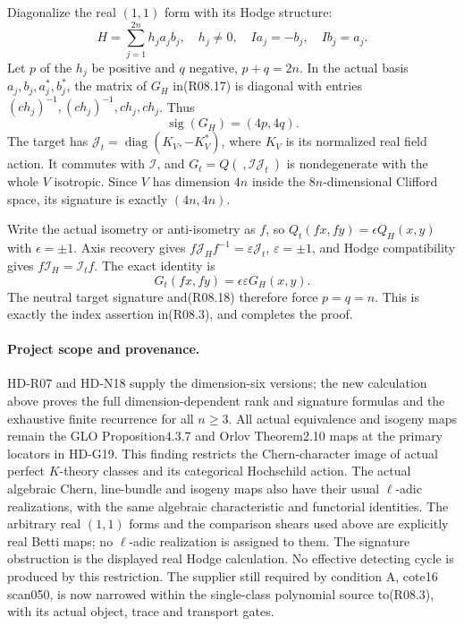 Diagonalize the real $(1,1)$ form with its Hodge structure:
\[
 H=\sum_{j=1}^{2n}h_j a_jb_j,\quad h_j\ne0,\quad
 Ia_j=-b_j,\quad Ib_j=a_j.
\]
Let $p$ of the $h_j$ be positive and $q$ negative, $p+q=2n$.
In the actual basis $a_j,b_j,a_j^*,b_j^*$, the matrix of $G_H$
in(R08.17) is diagonal with entries
$(ch_j)^{-1},(ch_j)^{-1},ch_j,ch_j$. Thus
\[
                          \operatorname{sig}(G_H)=(4p,4q).
                                                               \tag{R08.18}
\]
The target has
$\mathcal J_t=\operatorname{diag}(K_V,-K_V^*)$, where
$K_V$ is its normalized real field action. It commutes with
$\mathcal I$, and $G_t=Q(\ ,\mathcal I\mathcal J_t\ )$ is
nondegenerate with the whole $V$ isotropic. Since $V$ has
dimension $4n$ inside the $8n$-dimensional Clifford space,
its signature is exactly $(4n,4n)$.

Write the actual isometry or anti-isometry as $f$, so
$Q_t(fx,fy)=\epsilon Q_H(x,y)$ with $\epsilon=\pm1$.
Axis recovery gives
$f\mathcal J_Hf^{-1}=\varepsilon\mathcal J_t$,
$\varepsilon=\pm1$, and Hodge compatibility gives
$f\mathcal I_H=\mathcal I_t f$. The exact identity is
\[
                 G_t(fx,fy)=\epsilon\varepsilon G_H(x,y).
                                                               \tag{R08.19}
\]
The neutral target signature and(R08.18) therefore force
$p=q=n$. This is exactly the index assertion in(R08.3),
and completes the proof.

\paragraph{Project scope and provenance.}
HD-R07 and HD-N18 supply the dimension-six versions; the
new calculation above proves the full dimension-dependent
rank and signature formulas and the exhaustive finite
recurrence for all $n\ge3$. All actual equivalence and
isogeny maps remain the GLO Proposition4.3.7 and Orlov
Theorem2.10 maps at the primary locators in HD-G19.
This finding restricts the Chern-character image of actual
perfect $K$-theory classes and its categorical Hochschild
action. The actual algebraic Chern, line-bundle and isogeny
maps also have their usual $\ell$-adic realizations, with
the same algebraic characteristic and functorial identities.
The arbitrary real $(1,1)$ forms and the comparison shears
used above are explicitly real Betti maps; no $\ell$-adic
realization is assigned to them. The signature obstruction
is the displayed real Hodge calculation.
No effective detecting cycle is produced by this restriction.
The supplier still required by condition A, cote16 scan050,
is now narrowed within the single-class polynomial source
to(R08.3), with its actual object, trace and transport gates.
